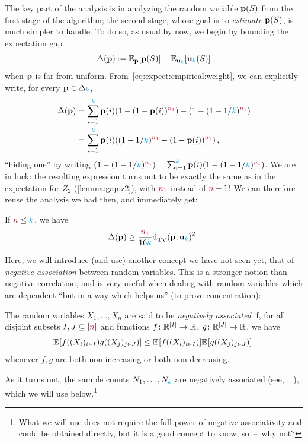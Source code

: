 The key part of the analysis is in analyzing the random variable $\mathbf{p}(S)$ from the first stage of the algorithm; the second stage, whose goal is to \emph{estimate} $\mathbf{p}(S)$, is much simpler to handle. To do so, as usual by now, we begin by bounding the expectation gap
\begin{equation}
    \Delta(\p) \eqdef \bE{\p}{\p(S)} - \bE{\uniform_\ab}{\uniform_\ab(S)}
\end{equation}
when $\mathbf{p}$ is far from uniform. From~\cref{eq:expect:empirical:weight}, we can explicitly write, for every $\mathbf{p}\in\Delta_{{\textcolor{cyan}{k}}}$,
\begin{align*}
  \Delta(\p) 
  &= \sum_{i=1}^\ab \p(i) (1-(1-\p(i))^{\nss}) - \Paren{1-(1-1/\ab)^{\nss}} \\
  &= \sum_{i=1}^\ab \p(i) \Paren{ (1-1/\ab)^{\nss} - (1-\p(i))^{\nss} }\,,
\end{align*}
``hiding one'' by writing $\Paren{1-(1-1/\ab)^{\nss}} = \sum_{i=1}^\ab \p(i)\Paren{1-(1-1/\ab)^{\nss}}$. We are in luck: the resulting expression turns out to be exactly the same as in the expectation for $Z_2$ (\cref{lemma:gap:z2}), with $\textcolor{red}{{\textcolor{purple}{n}}_1}$ instead of ${\textcolor{purple}{n}}-1$! We can therefore reuse the analysis we had then, and immediately get:
\begin{lemma}
  \label{lemma:gap:z7}
If ${\textcolor{purple}{n}} \leq {\textcolor{cyan}{k}}$, we have
\[
    \Delta(\p) \geq \frac{\nss}{16\ab}\totalvardist{\p}{\uniform_\ab}^2\,.
\]
\end{lemma}
Here, we will introduce (and use) another concept we have not seen yet, that of \emph{negative association} between random variables. This is a stronger notion than negative correlation, and is very useful when dealing with random variables which are dependent ``but in a way which helps us'' (to prove concentration):
\begin{definition}
\label{def:negative:association}
The random variables $X_1,\dots, X_n$ are said to be \emph{negatively associated} if, for all disjoint subsets $I,J\subseteq [{\textcolor{purple}{n}}]$ and functions $f\colon \mathbb{R}^{|I|} \to \mathbb{R}$, $g\colon \mathbb{R}^{|J|} \to \mathbb{R}$, we have
\[
    \bEE{f((X_i)_{i\in I})g((X_j)_{j\in J})} \leq \bEE{f((X_i)_{i\in I})}\bEE{g((X_j)_{j\in J})} \
\]
whenever $f,g$ are both non-increasing or both non-decreasing. 
\end{definition}
As it turns out, the sample counts $N_1,\dots,N_{\textcolor{cyan}{k}}$ are negatively associated (see, \eg,~\citep[Section~2.2]{DubhashiR98}), which we will use below.\footnote{What we will use does not require the full power of negative associativity and could be obtained directly, but it is a good concept to know, so~--~why not?} 
